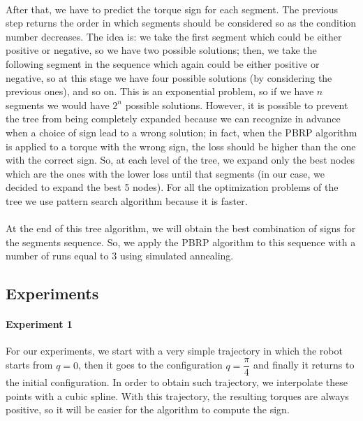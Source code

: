 \documentclass{article}
\begin{document}
\paragraph{}After that, we have to predict the torque sign for each segment. The previous step returns the order in which segments should be considered so as the condition number decreases. The idea is: we take the first segment which could be either positive or negative, so we have two possible solutions; then, we take the following segment in the sequence which again could be either positive or negative, so at this stage we have four possible solutions (by considering the previous ones), and so on. This is an exponential problem, so if we have $n$ segments we would have $2^n$ possible solutions. However, it is possible to prevent the tree from being completely expanded because we can recognize in advance when a choice of sign lead to a wrong solution; in fact, when the PBRP algorithm is applied to a torque with the wrong sign, the loss should be higher than the one with the correct sign. So, at each level of the tree, we expand only the best nodes which are the ones with the lower loss until that segments (in our case, we decided to expand the best 5 nodes). For all the optimization problems of the tree we use pattern search algorithm because it is faster.
\paragraph{}At the end of this tree algorithm, we will obtain the best combination of signs for the segments sequence. So, we apply the PBRP algorithm to this sequence with a number of runs equal to 3 using simulated annealing.

\subsection{Experiments}
\paragraph{Experiment 1}
For our experiments, we start with a very simple trajectory in which the robot starts from $q = 0$, then it goes to the configuration $q = \dfrac{\pi}{4}$ and finally it returns to the initial configuration. In order to obtain such trajectory, we interpolate these points with a cubic spline. With this trajectory, the resulting torques are always positive, so it will be easier for the algorithm to compute the sign.
\end{document}
